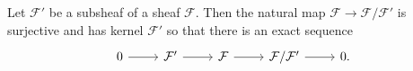 Let $\mathcal{F}'$ be a subsheaf of a sheaf $\mathcal{F}$. Then the
natural map $\mathcal{F}\to \mathcal{F}/\mathcal{F}'$ is surjective and has
kernel $\mathcal{F}'$ so that there is an exact sequence
\[\begin{tikzcd}
0 \arrow[r] & \mathcal{F}' \arrow[r] & \mathcal{F} \arrow[r] & \mathcal{F}/\mathcal{F}' \arrow[r] & 0.
\end{tikzcd}\]
